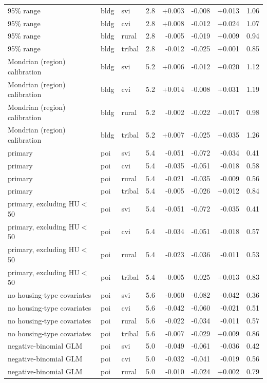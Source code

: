 {\begin{longtable}{lllrrrrr}
95\% range & bldg & svi & 2.8 & +0.003 & -0.008 & +0.013 & 1.06 \\
95\% range & bldg & cvi & 2.8 & +0.008 & -0.012 & +0.024 & 1.07 \\
95\% range & bldg & rural & 2.8 & -0.005 & -0.019 & +0.009 & 0.94 \\
95\% range & bldg & tribal & 2.8 & -0.012 & -0.025 & +0.001 & 0.85 \\
Mondrian (region) calibration & bldg & svi & 5.2 & +0.006 & -0.012 & +0.020 & 1.12 \\
Mondrian (region) calibration & bldg & cvi & 5.2 & +0.014 & -0.008 & +0.031 & 1.19 \\
Mondrian (region) calibration & bldg & rural & 5.2 & -0.002 & -0.022 & +0.017 & 0.98 \\
Mondrian (region) calibration & bldg & tribal & 5.2 & +0.007 & -0.025 & +0.035 & 1.26 \\
primary & poi & svi & 5.4 & -0.051 & -0.072 & -0.034 & 0.41 \\
primary & poi & cvi & 5.4 & -0.035 & -0.051 & -0.018 & 0.58 \\
primary & poi & rural & 5.4 & -0.021 & -0.035 & -0.009 & 0.56 \\
primary & poi & tribal & 5.4 & -0.005 & -0.026 & +0.012 & 0.84 \\
primary, excluding HU$<$50 & poi & svi & 5.4 & -0.051 & -0.072 & -0.035 & 0.41 \\
primary, excluding HU$<$50 & poi & cvi & 5.4 & -0.034 & -0.051 & -0.018 & 0.57 \\
primary, excluding HU$<$50 & poi & rural & 5.4 & -0.023 & -0.036 & -0.011 & 0.53 \\
primary, excluding HU$<$50 & poi & tribal & 5.4 & -0.005 & -0.025 & +0.013 & 0.83 \\
no housing-type covariates & poi & svi & 5.6 & -0.060 & -0.082 & -0.042 & 0.36 \\
no housing-type covariates & poi & cvi & 5.6 & -0.042 & -0.060 & -0.021 & 0.51 \\
no housing-type covariates & poi & rural & 5.6 & -0.022 & -0.034 & -0.011 & 0.57 \\
no housing-type covariates & poi & tribal & 5.6 & -0.007 & -0.029 & +0.009 & 0.86 \\
negative-binomial GLM & poi & svi & 5.0 & -0.049 & -0.061 & -0.036 & 0.42 \\
negative-binomial GLM & poi & cvi & 5.0 & -0.032 & -0.041 & -0.019 & 0.56 \\
negative-binomial GLM & poi & rural & 5.0 & -0.010 & -0.024 & +0.002 & 0.79 \\

\end{longtable}}
